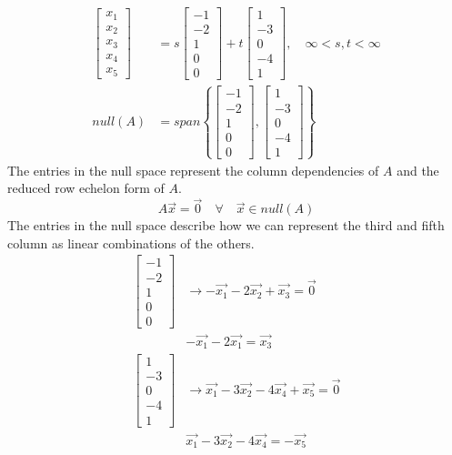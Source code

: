 \documentclass{math}
\begin{document}
\begin{align*}
  \begin{bmatrix}x_1 \\ x_2 \\ x_3 \\ x_4 \\ x_5\end{bmatrix} &=
    s\begin{bmatrix}-1 \\ -2 \\ 1 \\ 0 \\ 0\end{bmatrix}+
    t\begin{bmatrix}1 \\ -3 \\ 0 \\ -4 \\ 1\end{bmatrix},
      \quad \infty<s,t<\infty \\
  null(A) &= span\left\{
    \begin{bmatrix}-1 \\ -2 \\ 1 \\ 0 \\ 0\end{bmatrix},
    \begin{bmatrix}1 \\ -3 \\ 0 \\ -4 \\ 1\end{bmatrix}
  \right\}
\end{align*}
The entries in the null space represent the column dependencies of \( A \) and
the reduced row echelon form of \( A \).
\[ A\vec{x} = \vec{0} \quad\forall\quad \vec{x}\in null(A) \]
The entries in the null space describe how we can represent the third and fifth
column as linear combinations of the others.
\begin{align*}
  \begin{bmatrix}-1 \\ -2 \\ 1 \\ 0 \\ 0\end{bmatrix} &\to
    -\vec{x_1}-2\vec{x_2}+\vec{x_3} = \vec{0} \\
  & -\vec{x_1}-2\vec{x_1} = \vec{x_3} \\
  \begin{bmatrix}1 \\ -3 \\ 0 \\ -4 \\ 1\end{bmatrix} &\to
    \vec{x_1}-3\vec{x_2}-4\vec{x_4}+\vec{x_5} = \vec{0} \\
  & \vec{x_1}-3\vec{x_2}-4\vec{x_4} = -\vec{x_5}
\end{align*}
\end{document}
